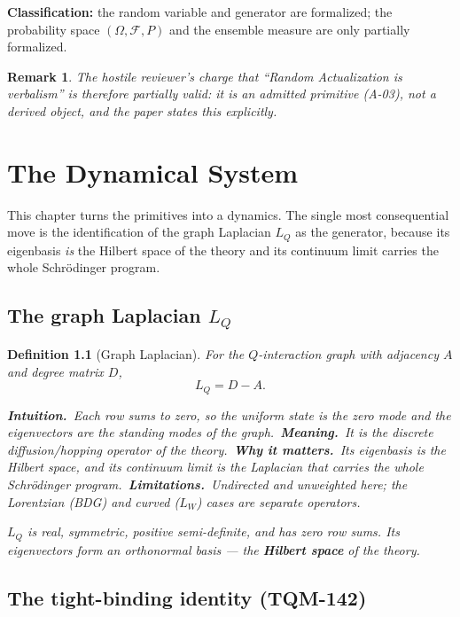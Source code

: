 \documentclass[10pt,twoside,openany]{book}
\newtheorem{definition}[theorem]{Definition}
\newtheorem{remark}[theorem]{Remark}
\newcommand{\eqnotes}[4]{%
  \par\smallskip\noindent
  \textbf{Intuition.}\ #1\ 
  \textbf{Meaning.}\ #2\ 
  \textbf{Why it matters.}\ #3\ 
  \textbf{Limitations.}\ #4\par}
\begin{document}
\textbf{Classification:} the random variable and generator are formalized; the probability
space $(\Omega,\mathcal F,P)$ and the ensemble measure are only partially formalized.

\begin{remark}
The hostile reviewer's charge that ``Random Actualization is verbalism'' is therefore
\emph{partially valid}: it is an \emph{admitted} primitive (A-03), not a derived object,
and the paper states this explicitly.
\end{remark}


\chapter{The Dynamical System}
\label{ch:dynamics}

This chapter turns the primitives into a dynamics. The single most consequential move is
the identification of the graph Laplacian $L_Q$ as the generator, because its eigenbasis
\emph{is} the Hilbert space of the theory and its continuum limit carries the whole
Schr\"odinger program.

\section{The graph Laplacian $L_Q$}

\begin{definition}[Graph Laplacian]
For the $Q$-interaction graph with adjacency $A$ and degree matrix $D$,
\begin{equation}
L_Q = D - A .
\end{equation}

\eqnotes
{Each row sums to zero, so the uniform state is the zero mode and the eigenvectors are the
standing modes of the graph.}
{It is the discrete diffusion/hopping operator of the theory.}
{Its eigenbasis \emph{is} the Hilbert space, and its continuum limit is the Laplacian that
carries the whole Schr\"odinger program.}
{Undirected and unweighted here; the Lorentzian (BDG) and curved ($L_W$) cases are separate
operators.}
$L_Q$ is real, symmetric, positive semi-definite, and has zero row sums. Its eigenvectors
form an orthonormal basis — the \textbf{Hilbert space} of the theory.
\end{definition}

\section{The tight-binding identity (TQM-142)}
\end{document}
